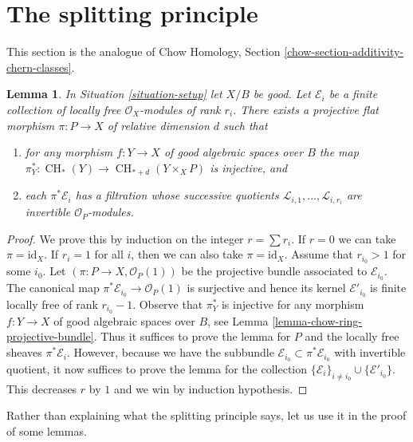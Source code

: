 \documentclass{stacks-project}
\theoremstyle{plain}
\newtheorem{lemma}[subsection]{Lemma}
\theoremstyle{definition}
\theoremstyle{remark}
\numberwithin{equation}{subsection}
\def\CH{\mathop{\mathrm{CH}}\nolimits}
\begin{document}
\section{The splitting principle}
\label{section-splitting-principle}

\noindent
This section is the analogue of Chow Homology, Section
\ref{chow-section-additivity-chern-classes}.

\begin{lemma}
\label{lemma-splitting-principle}
In Situation \ref{situation-setup} let $X/B$ be good.
Let $\mathcal{E}_i$ be a finite collection of locally free
$\mathcal{O}_X$-modules of rank $r_i$. There exists a projective
flat morphism $\pi : P \to X$ of relative dimension $d$ such that
\begin{enumerate}
\item for any morphism $f : Y \to X$ of good algebraic spaces
over $B$ the map
$\pi_Y^* : \CH_*(Y) \to \CH_{* + d}(Y \times_X P)$ is injective, and
\item each $\pi^*\mathcal{E}_i$ has a filtration
whose successive quotients $\mathcal{L}_{i, 1}, \ldots, \mathcal{L}_{i, r_i}$
are invertible ${\mathcal O}_P$-modules.
\end{enumerate}
\end{lemma}

\begin{proof}
We prove this by induction on the integer $r = \sum r_i$.
If $r = 0$ we can take $\pi = \text{id}_X$.
If $r_i = 1$ for all $i$, then we can also take $\pi = \text{id}_X$.
Assume that $r_{i_0} > 1$ for some $i_0$.
Let $(\pi : P \to X, \mathcal{O}_P(1))$
be the projective bundle associated to $\mathcal{E}_{i_0}$.
The canonical map $\pi^*\mathcal{E}_{i_0} \to \mathcal{O}_P(1)$
is surjective and hence its kernel $\mathcal{E}'_{i_0}$
is finite locally free of rank $r_{i_0} - 1$.
Observe that $\pi_Y^*$ is injective for any
morphism $f : Y \to X$ of good algebraic spaces
over $B$, see Lemma \ref{lemma-chow-ring-projective-bundle}.
Thus it suffices to prove the lemma for
$P$ and the locally free sheaves $\pi^*\mathcal{E}_i$.
However, because we have the subbundle
$\mathcal{E}_{i_0} \subset \pi^*\mathcal{E}_{i_0}$
with invertible quotient, it now suffices to prove
the lemma for the collection
$\{\mathcal{E}_i\}_{i \not = i_0} \cup \{\mathcal{E}'_{i_0}\}$.
This decreases $r$ by $1$ and we win by induction hypothesis.
\end{proof}

\noindent
Rather than explaining what the splitting principle says, let
us use it in the proof of some lemmas.
\end{document}
